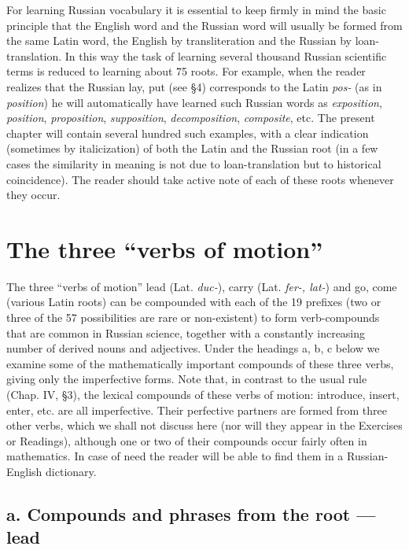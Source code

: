 For learning Russian vocabulary it is essential to keep firmly in mind the basic principle that the English word and the Russian word will usually be formed from the same Latin word, the English by transliteration and the Russian by loan-translation. In this way the task of learning several thousand Russian scientific terms is reduced to learning about 75 roots. For example, when the reader realizes that the Russian  lay, put (see §4) corresponds to the Latin \emph{pos-} (as in \emph{position}) he will automatically have learned such Russian words as  \emph{exposition},  \emph{position},  \emph{proposition},  \emph{supposition},  \emph{decomposition},  \emph{composite}, etc. The present chapter will contain several hundred such examples, with a clear indication (sometimes by italicization) of both the Latin and the Russian root (in a few cases the similarity in meaning is not due to loan-translation but to historical coincidence). The reader should take active note of each of these roots whenever they occur.

\section{The three ``verbs of motion''}

The three ``verbs of motion''  lead (Lat. \emph{duc-}),  carry (Lat. \emph{fer-, lat-}) and  go, come (various Latin roots) can be compounded with each of the 19 prefixes (two or three of the 57 possibilities are rare or non-existent) to form verb-compounds that are common in Russian science, together with a constantly increasing number of derived nouns and adjectives. Under the headings a, b, c below we examine some of the mathematically important compounds of these three verbs, giving only the imperfective forms. Note that, in contrast to the usual rule (Chap. IV, §3), the lexical compounds of these verbs of motion:  introduce,  insert,  enter, etc. are all imperfective. Their perfective partners are formed from three other verbs, which we shall not discuss here (nor will they appear in the Exercises or Readings), although one or two of their compounds occur fairly often in mathematics. In case of need the reader will be able to find them in a Russian-English dictionary.

\subsection*{a. Compounds and phrases from the root  --- lead}

